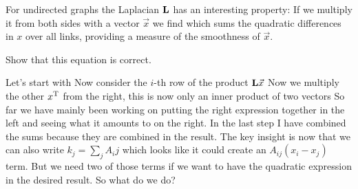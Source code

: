 For undirected graphs the Laplacian $\bf L$ has an interesting property: If we multiply it from both sides with a vector $\vec{x}$ we find 
which sums the quadratic differences in $x$ over all links, providing a measure of the smoothness of $\vec{x}$.

\subquestion Show that this equation is correct.   

\solution 
Let's start with 
Now consider the $i$-th row of the product ${\bf L} \vec{x}$ 
Now we multiply the other $x^{\rm T}$ from the right, this is now only an inner product of two vectors  
So far we have mainly been working on putting the right expression together in the left and seeing what it amounts to on the right. In the last step I have combined the sums because they are combined in the result. The key insight is now that we can also write $k_j=\sum_j A_ij$ which looks like it could create an $A_{ij}(x_i-x_j)$ term. But we need two of those terms if we want to have the quadratic expression in the desired result. So what do we do?

